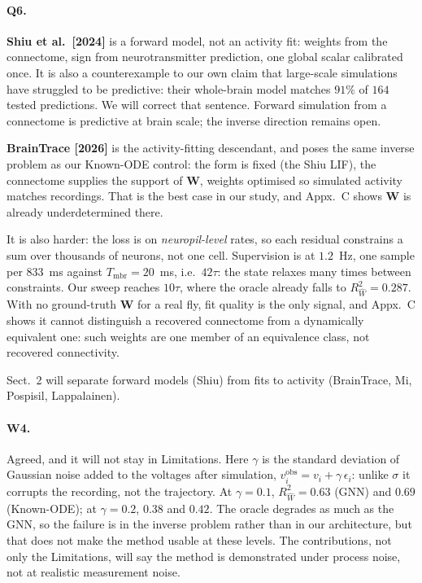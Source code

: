 \documentclass[11pt]{article}
\newcommand{\Rw}{R^2_{\widehat W}}
\newcommand{\Mat}[1]{\mathbf{#1}}
\begin{document}
\paragraph{Q6.}
\textbf{Shiu et al.\ [2024]} is a forward model, not an activity fit: weights from
the connectome, sign from neurotransmitter prediction, one global scalar
calibrated once. It is also a counterexample to our own claim that large-scale
simulations have struggled to be predictive: their whole-brain model matches
$91\%$ of $164$ tested predictions. We will correct that sentence. Forward
simulation from a connectome is predictive at brain scale; the inverse direction
remains open.

\textbf{BrainTrace [2026]} is the activity-fitting descendant, and poses the same
inverse problem as our Known-ODE control: the form is fixed (the Shiu LIF), the
connectome supplies the support of $\Mat{W}$, weights optimised so simulated
activity matches recordings. That is the best case in our study, and Appx.~C
shows $\Mat{W}$ is already underdetermined there.

It is also harder: the loss is on \emph{neuropil-level} rates, so each residual
constrains a sum over thousands of neurons, not one cell. Supervision is at $1.2$~Hz,
one sample per $833$~ms against $T_{\mathrm{mbr}} = 20$~ms, i.e.\ $42\tau$: the state relaxes many times between constraints. Our sweep reaches
$10\tau$, where the oracle already falls to $\Rw = 0.287$. With no ground-truth
$\Mat{W}$ for a real fly, fit quality is the only signal, and Appx.~C shows it
cannot distinguish a recovered connectome from a dynamically equivalent one: such
weights are one member of an equivalence class, not recovered connectivity.

Sect.~2 will separate forward models (Shiu) from fits to activity (BrainTrace,
Mi, Pospisil, Lappalainen).

\paragraph{W4.}
Agreed, and it will not stay in Limitations. Here $\gamma$ is the standard
deviation of Gaussian noise added to the voltages after simulation,
$v_i^{\mathrm{obs}} = v_i + \gamma\,\epsilon_i$: unlike $\sigma$ it corrupts the
recording, not the trajectory. At $\gamma = 0.1$, $\Rw = 0.63$ (GNN) and $0.69$
(Known-ODE); at $\gamma = 0.2$, $0.38$ and $0.42$. The oracle degrades as much as
the GNN, so the failure is in the inverse problem rather than in our
architecture, but that does not make the method usable at these levels. The
contributions, not only the Limitations, will say the method is demonstrated
under process noise, not at realistic measurement noise.
\end{document}
